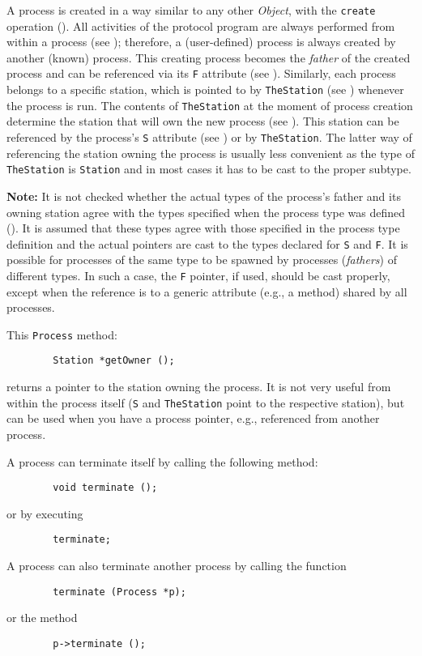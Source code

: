 A process is created in a way similar to any other {\em Object}, with the
{\tt create} operation ().
All activities of the protocol program are always performed from
within a process (see ); therefore, a (user-defined)
process is always created by another (known) process.
This creating process becomes the {\em father\/} of the created process
and can be referenced via its {\tt F} attribute (see ).
Similarly, each process belongs to a specific station, which is pointed to
by {\tt TheStation} (see ) whenever the process is run.
The contents of {\tt TheStation} at the moment of process creation
determine the station that will own the new process (see ).
This station can be referenced by the process's {\tt S} attribute
(see ) or by {\tt TheStation}.
The latter way of referencing the station owning the process is usually less
convenient as the type of {\tt TheStation} is {\tt Station} and in most
cases it has to be cast to the proper subtype.

\medskip

\noindent
{\bf Note:} It is not checked whether the actual types of the process's
father and its owning station agree with the types specified when the
process type was defined ().
It is assumed that these types agree with those specified in the
process type definition and the actual pointers are cast to the types
declared for {\tt S} and {\tt F}.
It is possible for processes of the same type to be spawned by processes
({\em fathers\/}) of different types.
In such a case, the {\tt F} pointer, if used, should be cast properly, except
when the reference is to a generic attribute (e.g., a method)
shared by all processes.

\medskip

This {\tt Process} method:
\begin{verbatim}
        Station *getOwner ();
\end{verbatim}
returns a pointer to the station owning the process. 
It is not very useful from within the process itself ({\tt S} and
{\tt TheStation} point to the respective station), but can be used when you
have a process pointer, e.g., referenced from another process.

A process can terminate itself by calling the following method:
\begin{verbatim}
        void terminate ();
\end{verbatim}
or by executing
\begin{verbatim}
        terminate;
\end{verbatim}
A process can also terminate another process by calling the function
\begin{verbatim}
        terminate (Process *p);
\end{verbatim}
or the method
\begin{verbatim}
        p->terminate ();
\end{verbatim}

